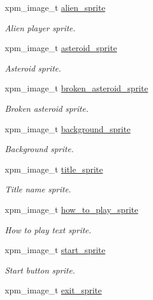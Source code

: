 \begin{DoxyCompactItemize}
xpm\+\_\+image\+\_\+t \hyperlink{group__Main-Menu_ga69acbc91c439d0d9f047cbe70ade84cc}{alien\+\_\+sprite}
\begin{DoxyCompactList}\small\item\em Alien player sprite. \end{DoxyCompactList}\item 
xpm\+\_\+image\+\_\+t \hyperlink{group__Main-Menu_ga45f80f61d0103ffc208c2d0493380fb2}{asteroid\+\_\+sprite}
\begin{DoxyCompactList}\small\item\em Asteroid sprite. \end{DoxyCompactList}\item 
xpm\+\_\+image\+\_\+t \hyperlink{group__Main-Menu_ga06a70f098733d826cb9d8e81e7104983}{broken\+\_\+asteroid\+\_\+sprite}
\begin{DoxyCompactList}\small\item\em Broken asteroid sprite. \end{DoxyCompactList}\item 
xpm\+\_\+image\+\_\+t \hyperlink{group__Main-Menu_ga5a4cfb92e48a82e5d50c87e4bc632970}{background\+\_\+sprite}
\begin{DoxyCompactList}\small\item\em Background sprite. \end{DoxyCompactList}\item 
xpm\+\_\+image\+\_\+t \hyperlink{group__Main-Menu_ga55fa0635c490a8f9333972d949a5216e}{title\+\_\+sprite}
\begin{DoxyCompactList}\small\item\em Title name sprite. \end{DoxyCompactList}\item 
xpm\+\_\+image\+\_\+t \hyperlink{group__Main-Menu_ga5bb71c838fd9ce7847f379d2c17483ab}{how\+\_\+to\+\_\+play\+\_\+sprite}
\begin{DoxyCompactList}\small\item\em How to play text sprite. \end{DoxyCompactList}\item 
xpm\+\_\+image\+\_\+t \hyperlink{group__Main-Menu_ga522a4ef9103746c5c1ba61e915e39f0a}{start\+\_\+sprite}
\begin{DoxyCompactList}\small\item\em Start button sprite. \end{DoxyCompactList}\item 
xpm\+\_\+image\+\_\+t \hyperlink{group__Main-Menu_ga151ed16274d40549e8aa6715aa4c715a}{exit\+\_\+sprite}

\end{DoxyCompactItemize}
